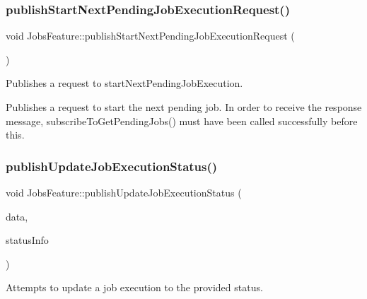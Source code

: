 \subsubsection{\texorpdfstring{publish\+Start\+Next\+Pending\+Job\+Execution\+Request()}{publishStartNextPendingJobExecutionRequest()}}
{\footnotesize\ttfamily void Jobs\+Feature\+::publish\+Start\+Next\+Pending\+Job\+Execution\+Request (\begin{DoxyParamCaption}{ }\end{DoxyParamCaption})\hspace{0.3cm}{\ttfamily [private]}}



Publishes a request to start\+Next\+Pending\+Job\+Execution. 

Publishes a request to start the next pending job. In order to receive the response message, subscribe\+To\+Get\+Pending\+Jobs() must have been called successfully before this. \mbox{\label{class_aws_1_1_iot_1_1_device_client_1_1_jobs_1_1_jobs_feature_af56753139f5926916926fc15d1b43f58}} 
\subsubsection{\texorpdfstring{publish\+Update\+Job\+Execution\+Status()}{publishUpdateJobExecutionStatus()}}
{\footnotesize\ttfamily void Jobs\+Feature\+::publish\+Update\+Job\+Execution\+Status (\begin{DoxyParamCaption}\item[{Aws\+::\+Iotjobs\+::\+Job\+Execution\+Data}]{data,  }\item[{\hyperlink{struct_aws_1_1_iot_1_1_device_client_1_1_jobs_1_1_jobs_feature_1_1_job_execution_status_info}{Job\+Execution\+Status\+Info}}]{status\+Info }\end{DoxyParamCaption})\hspace{0.3cm}{\ttfamily [private]}}



Attempts to update a job execution to the provided status. 


